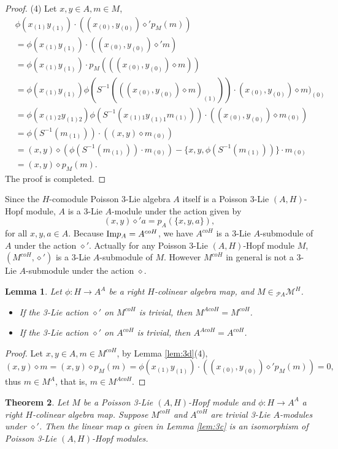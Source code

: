 \documentclass[11pt]{article}
\newtheorem{theorem}{Theorem}[section]
\newtheorem{lemma}[theorem]{Lemma}
\def\di{\diamond}
\begin{document}
\begin{proof}
(4) Let $x,y\in A,m\in M$,
\begin{align*}
&\phi(x_{(1)}y_{(1)})\cdot ((x_{(0)},y_{(0)})\di'p_M(m))\\
&=\phi(x_{(1)}y_{(1)})\cdot ((x_{(0)},y_{(0)})\di'm)\\
&=\phi(x_{(1)}y_{(1)})\cdot p_M(((x_{(0)},y_{(0)})\di m))\\
&=\phi(x_{(1)}y_{(1)})\phi(S^{-1}(((x_{(0)},y_{(0)})\di m)_{(1)}))\cdot (x_{(0)},y_{(0)})\di m)_{(0)}\\
&=\phi(x_{(1)2}y_{(1)2})\phi(S^{-1}(x_{(1)1}y_{(1)1}m_{(1)}))\cdot ((x_{(0)},y_{(0)})\di m_{(0)})\\
&=\phi(S^{-1}(m_{(1)}))\cdot ((x,y)\di m_{(0)})\\
&=(x,y)\di(\phi(S^{-1}(m_{(1)}))\cdot m_{(0)})-\{x,y,\phi(S^{-1}(m_{(1)}))\}\cdot m_{(0)}\\
&=(x,y)\di p_M(m).
\end{align*}
The proof is completed.
\end{proof}

Since the $H$-comodule Poisson 3-Lie algebra $A$ itself is a Poisson 3-Lie $(A,H)$-Hopf module, $A$ is a 3-Lie $A$-module under the action given by
$$(x,y)\di'a=p_A(\{x,y,a\}), $$
for all $x,y,a\in A$. Because $\textup{Im}p_A=A^{coH}$, we have $A^{coH}$ is a 3-Lie $A$-submodule of $A$ under the action $\di'$. Actually for any Poisson 3-Lie $(A,H)$-Hopf module $M$, $(M^{coH},\di')$ is a 3-Lie $A$-submodule of $M$. However $M^{coH}$ in general is not a 3-Lie $A$-submodule under the action $\di$.

\begin{lemma}\label{lem:3e}
Let $\phi:H\rightarrow A^A$ be a right $H$-colinear algebra map, and $M\in\! _{\mathcal{P}A}\mathcal{M}^H$.
\begin{itemize}
  \item [(1)] If the 3-Lie action $\di'$ on $M^{coH}$ is trivial, then $M^{AcoH}=M^{coH}$.
  \item [(2)] If the 3-Lie action $\di'$ on $A^{coH}$ is trivial, then $A^{AcoH}=A^{coH}$.
\end{itemize}
\end{lemma}

\begin{proof}
Let $x,y\in A,m\in M^{coH}$, by Lemma \ref{lem:3d}(4), 
$$(x,y)\di m=(x,y)\di p_M(m)=\phi(x_{(1)}y_{(1)})\cdot ((x_{(0)},y_{(0)})\di'p_M(m))=0,$$
thus $m\in M^A$, that is, $m\in M^{AcoH}$.
\end{proof}

\begin{theorem}\label{thm:3f}
Let $M$ be a Poisson 3-Lie $(A, H)$-Hopf module and $\phi:H\rightarrow A^A$ a right $H$-colinear algebra map. Suppose $M^{coH}$ and $A^{coH}$ are trivial 3-Lie $A$-modules under $\di'$. Then the linear map $\alpha$ given in Lemma \ref{lem:3c} is an isomorphism of Poisson 3-Lie $(A, H)$-Hopf modules.
\end{theorem}
\end{document}
